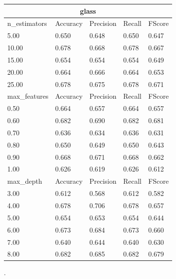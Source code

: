 \documentclass[12pt,a4paper]{article}
\begin{document}
\begin{tabular}{ |p{3cm}||p{2cm}|p{2cm}|p{2cm}|p{2cm}| }
\hline
\multicolumn{5}{|c|}{glass}\\
\hline
n\_estimators & Accuracy & Precision & Recall & FScore \\
\hline
5.00 & 0.650 & 0.648 & 0.650 & 0.647\\
10.00 & 0.678 & 0.668 & 0.678 & 0.667\\
15.00 & 0.654 & 0.654 & 0.654 & 0.649\\
20.00 & 0.664 & 0.666 & 0.664 & 0.653\\
25.00 & 0.678 & 0.675 & 0.678 & 0.671\\
\hline
max\_features & Accuracy & Precision & Recall & FScore \\
\hline
0.50 & 0.664 & 0.657 & 0.664 & 0.657\\
0.60 & 0.682 & 0.690 & 0.682 & 0.681\\
0.70 & 0.636 & 0.634 & 0.636 & 0.631\\
0.80 & 0.650 & 0.649 & 0.650 & 0.643\\
0.90 & 0.668 & 0.671 & 0.668 & 0.662\\
1.00 & 0.626 & 0.619 & 0.626 & 0.612\\
\hline
max\_depth & Accuracy & Precision & Recall & FScore \\
\hline
3.00 & 0.612 & 0.568 & 0.612 & 0.582\\
4.00 & 0.678 & 0.706 & 0.678 & 0.657\\
5.00 & 0.654 & 0.653 & 0.654 & 0.644\\
6.00 & 0.673 & 0.684 & 0.673 & 0.660\\
7.00 & 0.640 & 0.644 & 0.640 & 0.630\\
8.00 & 0.682 & 0.685 & 0.682 & 0.679\\
\hline
\end{tabular}
.\\
\end{document}
